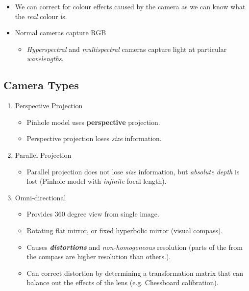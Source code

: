 \documentclass[english, 10pt]{article}
\begin{document}
\begin{itemize}
\itemsep1pt\parskip0pt
\item
  We can correct for colour effects caused by the camera as we can know
  what the \emph{real} colour is.
\item
  Normal cameras capture RGB

  \begin{itemize}
  \itemsep1pt\parskip0pt
  \item
    \emph{Hyperspectral} and \emph{multispectral} cameras capture light
    at particular \emph{wavelengths}.
  \end{itemize}
\end{itemize}

\subsection{Camera Types}\label{camera-types}

\begin{enumerate}
\def\labelenumi{\arabic{enumi}.}
\itemsep1pt\parskip0pt

\item
  Perspective Projection

  \begin{itemize}
  \itemsep1pt\parskip0pt
  \item
    Pinhole model uses \textbf{perspective} projection.
  \item
    Perspective projection loses \emph{size} information.
  \end{itemize}
\item
  Parallel Projection

  \begin{itemize}
  \itemsep1pt\parskip0pt
  \item
    Parallel projection does not lose \emph{size} information, but
    \emph{absolute depth} is lost (Pinhole model with \emph{infinite}
    focal length).
  \end{itemize}
\item
  Omni-directional

  \begin{itemize}
  \itemsep1pt\parskip0pt
  \item
    Provides 360 degree view from single image.
  \item
    Rotating flat mirror, or fixed hyperbolic mirror (visual compass).
  \item
    Causes \emph{\textbf{distortions}} and \emph{non-homogeneous} resolution
    (parts of the from the compass are higher resolution than others.).
  \item
    Can correct distortion by determining a transformation matrix that
    can balance out the effects of the lens (e.g. Chessboard calibration).
  \end{itemize}
\end{enumerate}
\end{document}
